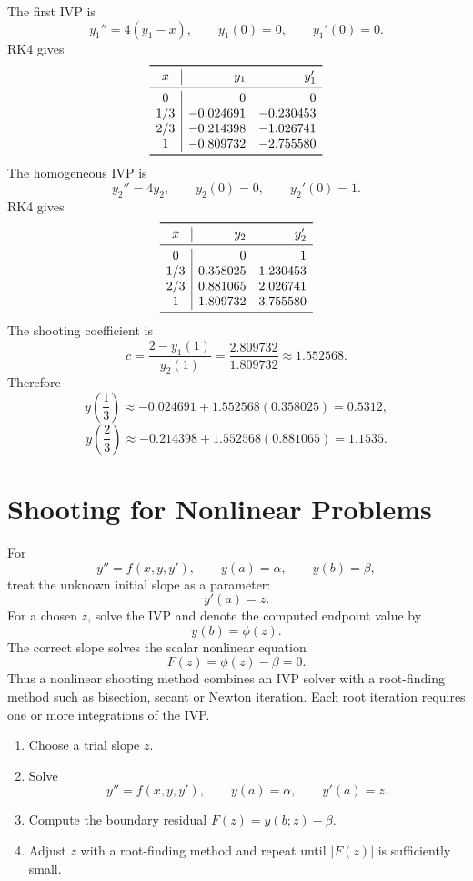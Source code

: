 \begin{solution}[9.0cm]
The first IVP is
\[
 y_1''=4(y_1-x),
 \qquad y_1(0)=0,
 \qquad y_1'(0)=0.
\]
RK4 gives
\[
\begin{array}{c|rr}
\toprule
x&y_1&y_1'\\
\midrule
0&0&0\\
1/3&-0.024691&-0.230453\\
2/3&-0.214398&-1.026741\\
1&-0.809732&-2.755580\\
\bottomrule
\end{array}
\]
The homogeneous IVP is
\[
 y_2''=4y_2,
 \qquad y_2(0)=0,
 \qquad y_2'(0)=1.
\]
RK4 gives
\[
\begin{array}{c|rr}
\toprule
x&y_2&y_2'\\
\midrule
0&0&1\\
1/3&0.358025&1.230453\\
2/3&0.881065&2.026741\\
1&1.809732&3.755580\\
\bottomrule
\end{array}
\]
The shooting coefficient is
\[
 c=\frac{2-y_1(1)}{y_2(1)}
 =\frac{2.809732}{1.809732}
 \approx1.552568.
\]
Therefore
\[
 y\left(\frac13\right)
 \approx-0.024691+1.552568(0.358025)
 =0.5312,
\]
\[
 y\left(\frac23\right)
 \approx-0.214398+1.552568(0.881065)
 =1.1535.
\]
\end{solution}

\section{Shooting for Nonlinear Problems}

For
\[
 y''=f(x,y,y'),
 \qquad y(a)=\alpha,
 \qquad y(b)=\beta,
\]
treat the unknown initial slope as a parameter:
\[
 y'(a)=z.
\]
For a chosen $z$, solve the IVP and denote the computed endpoint value by
\[
 y(b)=\phi(z).
\]
The correct slope solves the scalar nonlinear equation
\[
 F(z)=\phi(z)-\beta=0.
\]
Thus a nonlinear shooting method combines an IVP solver with a root-finding method such as bisection, secant or Newton iteration.  Each root iteration requires one or more integrations of the IVP.

\begin{algorithm}
\begin{enumerate}
  \item Choose a trial slope $z$.
  \item Solve
  \[
    y''=f(x,y,y'),
    \qquad y(a)=\alpha,
    \qquad y'(a)=z.
  \]
  \item Compute the boundary residual $F(z)=y(b;z)-\beta$.
  \item Adjust $z$ with a root-finding method and repeat until $|F(z)|$ is sufficiently small.
\end{enumerate}
\end{algorithm}

